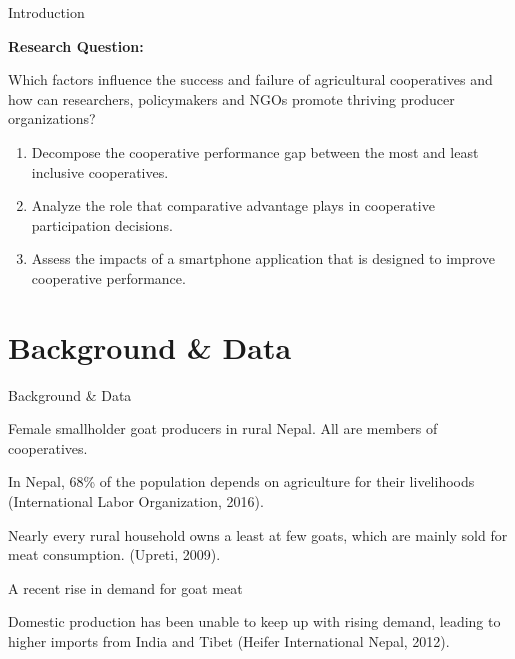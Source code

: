 \documentclass[aspectratio=169]{beamer}
\newenvironment{wideitemize}{\itemize\addtolength{\itemsep}{10pt}}{\enditemize}
\begin{document}
\begin{frame}{Introduction}

\textbf{Research Question:} \vspace{.5cm}
    \begin{wideitemize}
        \item Which factors influence the success and failure of agricultural cooperatives and how can researchers, policymakers and NGOs promote thriving producer organizations? \vspace{.25cm}
            \begin{enumerate}
                \item Decompose the cooperative performance gap between the most and least inclusive cooperatives. \vspace{.25cm}
                \item Analyze the role that comparative advantage plays in cooperative participation decisions. \vspace{.25cm}
                \item Assess the impacts of a smartphone application that is designed to improve cooperative performance.
            \end{enumerate}
    \end{wideitemize}
\end{frame}

\section{Background \& Data}

\begin{frame}{Background \& Data}
    \begin{wideitemize}
        \item Female smallholder goat producers in rural Nepal. All are members of cooperatives. 
        \item In Nepal, 68\% of the population depends on agriculture for their livelihoods (International Labor Organization, 2016). 
        \item Nearly every rural household owns a least at few goats, which are mainly sold for meat consumption. (Upreti, 2009). 
        \item A recent rise in demand for goat meat \vspace{.25cm}
        \begin{wideitemize}
            \item Domestic production has been unable to keep up with rising demand, leading to higher imports from India and Tibet (Heifer International Nepal, 2012).
        \end{wideitemize}
    \end{wideitemize}
\end{frame}
\end{document}
